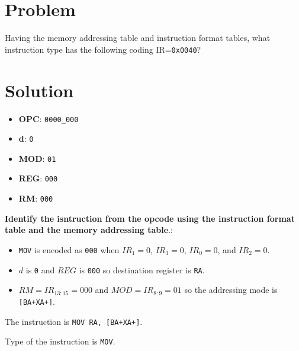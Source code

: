\section*{Problem}
Having the memory addressing table and instruction format tables, what instruction type has the following coding IR=\texttt{0x0040}?

\section*{Solution}


\begin{itemize}
    \item \textbf{OPC}: \texttt{0000\_000}
    \item \textbf{d}: \texttt{0}
    \item \textbf{MOD}: \texttt{01}
    \item \textbf{REG}: \texttt{000}
    \item \textbf{RM}: \texttt{000}
\end{itemize}


\textbf{Identify the isntruction from the opcode using the instruction format table and the memory addressing table}.:
\begin{itemize}
    \item \texttt{MOV} is encoded as \texttt{000} when $IR_{1}=0$, $IR_{3}=0$, $IR_{0}=0$, and $IR_{2}=0$.
    \item $d$ is \texttt{0} and $REG$ is \texttt{000} so destination register is \texttt{RA}.
    \item $RM=IR_{13:15}=000$ and $MOD=IR_{8:9}=01$ so the addressing mode is \texttt{[BA+XA+]}.
\end{itemize}

The instruction is \texttt{MOV RA, [BA+XA+]}.

Type of the instruction is \texttt{MOV}.